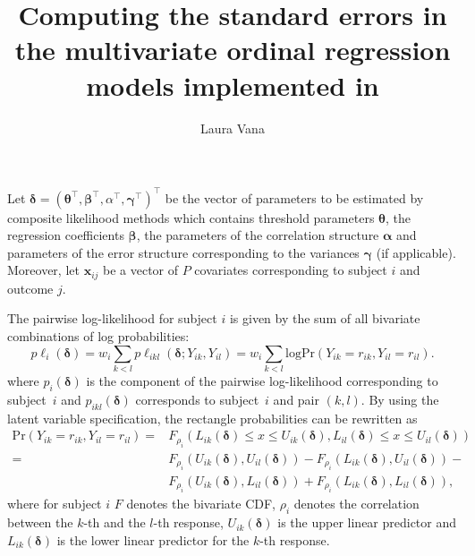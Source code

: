 \documentclass[a4paper,fleqn]{article}
\title{Computing the standard errors in the multivariate ordinal regression models implemented in \pkg{mvord}}
\author{Laura  Vana}
\newcommand{\LOG}{\mathrm{log}}
\begin{document}
\maketitle{}

\noindent

Let $\bm\delta = (\bm{\theta}^\top, \bm{\beta}^\top,\alpha^\top, \bm\gamma^\top)^\top$ be the vector of parameters to be estimated by composite likelihood methods which contains threshold parameters $\bm{\theta}$, the regression
coefficients $\bm{\beta}$, the
parameters of the correlation structure $\bm\alpha$ and parameters of the error structure corresponding to the variances $\bm\gamma$ (if applicable). Moreover, let $\bm x_{ij}$ be a vector of $P$ covariates corresponding to subject $i$ and outcome $j$.

The pairwise log-likelihood for subject $i$ is given by the sum of all bivariate combinations of log probabilities:
$$p\ell_i(\bm\delta)= w_i\sum_{k<l} p\ell_{ikl}(\bm\delta; Y_{ik},Y_{il})= w_i\sum_{k<l}\LOG \mathrm{Pr}(Y_{ik}=r_{ik}, Y_{il}=r_{il}).$$
where $p_i(\bm\delta)$ is the component of the pairwise log-likelihood corresponding to subject~$i$ and
$p_{ikl}(\bm \delta)$ corresponds to subject~$i$ and pair $(k, l)$.
By using the latent variable specification, the rectangle probabilities can be rewritten as
\begin{align*}
\mathrm{Pr}(Y_{ik}=r_{ik}, Y_{il}=r_{il})=& F_{\rho_i}(L_{ik}(\bm\delta)\leq x\leq U_{ik}(\bm\delta), L_{il}(\bm\delta)\leq x\leq U_{il}(\bm\delta))\\
 =& F_{\rho_i}(U_{ik}(\bm\delta), U_{il}(\bm\delta)) -
   F_{\rho_i}(L_{ik}(\bm\delta), U_{il}(\bm\delta)) -\\
&  F_{\rho_i}(U_{ik}(\bm\delta), L_{il}(\bm\delta)) +
   F_{\rho_i}(L_{ik}(\bm\delta), L_{il}(\bm\delta)),
\end{align*}
where for subject $i$ $F$ denotes the bivariate CDF, $\rho_i$ denotes the correlation between the $k$-th and the $l$-th response,
$U_{ik}(\bm\delta)$ is the upper linear predictor and $L_{ik}(\bm\delta)$ is the lower linear predictor for the $k$-th response.
\end{document}
